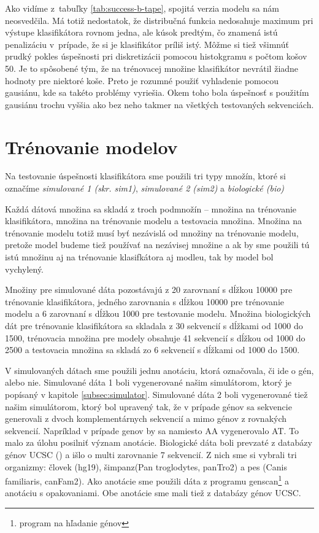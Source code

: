Ako vidíme z~tabuľky \ref{tab:success-b-tape}, spojitá verzia modelu sa nám neosvedčila. Má totiž nedostatok, že distribučná funkcia nedosahuje maximum pri výstupe klasifikátora rovnom jedna, ale kúsok predtým, čo znamená istú penalizáciu v~prípade, že si je klasifikátor príliš istý.
Môžme si tiež všimnúť prudký pokles úspešnosti pri diskretizácii pomocou histokgramu s počtom košov 50. Je to spôsobené tým, že na trénovacej množine klasifikátor nevrátil žiadne hodnoty pre niektoré koše. Preto je rozumné použiť vyhladenie pomocou gausiánu, kde sa takéto problémy vyriešia. Okem toho bola úspešnosť s použitím gausiánu trochu vyššia ako bez neho takmer na všetkých testovaných sekvenciách.

\section{Trénovanie modelov}
\label{sec:model-training}

Na testovanie úspešnosti klasifikátora sme použili tri typy množín, ktoré si označíme \textit{simulované 1 (skr. sim1)}, \textit{simulované 2 (sim2)} a \textit{biologické (bio)}

Každá dátová množina sa skladá z troch podmnožín -- množina na trénovanie klasifikátora, množina na trénovanie modelu a testovacia množina.
Množina na trénovanie modelu totiž musí byť nezávislá od množiny na trénovanie modelu, pretože model budeme tiež používať na nezávisej množine a ak by sme použili tú istú množinu aj na trénovanie klasifkátora aj modleu, tak by model bol vychylený.

Množiny pre simulované dáta pozostávajú z 20 zarovnaní s dĺžkou 10000 pre trénovanie klasifikátora, jedného zarovnania s dĺžkou 10000 pre trénovanie modelu a 6 zarovnaní s dĺžkou 1000 pre testovanie modelu.
Množina biologických dát pre trénovanie klasifikátora sa skladala z 30 sekvencií s dĺžkami od 1000 do 1500, trénovacia množina pre modely obsahuje 41 sekvencií s dĺžkou od 1000 do 2500 a testovacia množina sa skladá zo 6 sekvencií s dĺžkami od 1000 do 1500.

V simulovaných dátach sme použili jednu anotáciu, ktorá označovala, či ide o gén, alebo nie.
Simulované dáta 1 boli vygenerované našim simulátorom, ktorý je popísaný v kapitole \ref{subsec:simulator}.
Simulované dáta 2 boli vygenerované tiež našim simulátorom, ktorý bol upravený tak, že v prípade génov sa sekvencie generovali z dvoch komplementárnych sekvencií a mimo génov z rovnakých sekvencií. Napríklad v prípade genov by sa namiesto AA vygenerovalo AT. To malo za úlohu posilniť význam anotácie.
Biologické dáta boli prevzaté z databázy génov UCSC (\cite{karolchik2003ucsc}) a išlo o multi zarovnanie 7 sekvencií.
Z nich sme si vybrali tri organizmy: človek (hg19), šimpanz(Pan troglodytes, panTro2) a pes (Canis familiaris, canFam2).
Ako anotácie sme použili dáta z programu genscan\footnote{program na hľadanie génov} a anotáciu s opakovaniami. Obe anotácie sme mali tiež z databázy génov UCSC.

